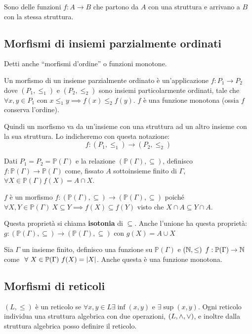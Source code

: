 Sono delle funzioni $f : A \to B$ che partono da $A$ con una struttura e arrivano a $B$ con la stessa struttura.

\subsection{Morfismi di insiemi parzialmente ordinati}

Detti anche ``morfismi d'ordine'' o funzioni monotone. 
\begin{defn}
Un morfismo di un insieme parzialmente ordinato \`e un'applicazione $f : P_1 \to P_2$ dove $(P_1, \le_{1})$ e $(P_2, \le_{2})$ sono insiemi particolarmente ordinati, tale che $\forall x, y \in P_1$ con $x \le_1 y \implies f(x) \le_2 f(y)$. $f$ \`e una funzione monotona (ossia $f$ conserva l'ordine). 
\end{defn}
Quindi un morfismo va da un'insieme con una struttura ad un altro insieme con la sua struttura. Lo indicheremo con questa notazione:
\[
f : (P_1, \le_{1}) \to (P_2, \le_{2})
\]
\begin{exmp}
Dati $P_1 = P_2 = \mathbb{P}(\Gamma)$ e la relazione $(\mathbb{P}(\Gamma), \subseteq)$, definisco $f : \mathbb{P}(\Gamma) \to \mathbb{P}(\Gamma)$ come, fissato $A$ sottoinsieme finito di $\Gamma$, $\forall X \in \mathbb{P}(\Gamma) f(X) = A \cap X$.

$f$ \`e un morfismo $f : (\mathbb{P}(\Gamma), \subseteq) \to (\mathbb{P}(\Gamma), \subseteq)$ poich\'e $\forall X, Y \in \mathbb{P}(\Gamma) \ X \subseteq Y \implies f(X) \subseteq f(Y)$ visto che $X \cap A \subseteq Y \cap A$.
\end{exmp}
Questa propriet\`a si chiama \textbf{isotonia} di $\subseteq$. Anche l'unione ha questa propriet\`a: $g : (\mathbb{P}(\Gamma), \subseteq) \to (\mathbb{P}(\Gamma), \subseteq)$ con $g(X) = A \cup X$

\begin{exmp}
Sia $\Gamma$ un insieme finito, definisco una funzione su $\mathbb{P}(\Gamma)$ e $(\mathbb{N}, \le)$ $f : \mathbb{P}(\Gamma) \to \mathbb{N}$ come $\forall X \in \mathbb{P}(\Gamma) \ f(X) = \abs{X}$. Anche questa \`e una funzione monotona.
\end{exmp}

\subsection{Morfismi di reticoli}

$(L, \le)$ \`e un reticolo se $\forall x, y \in L \exists \inf(x, y) $ e $ \exists \sup(x,y)$. Ogni reticolo individua una struttura algebrica con due operazioni, $(L, \wedge, \vee)$, e inoltre dalla struttura algebrica posso definire il reticolo.

